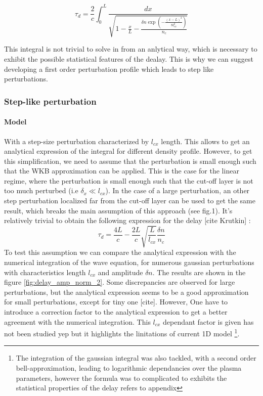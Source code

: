 \documentclass[11pt,a4paper]{report}
\begin{document}
\begin{multicols}{2}
    $$\tau_d = \frac{2}{c} \int_0^L \frac{dx}{\sqrt{1 - \frac{x}{L} - \frac{\delta n\exp(-\frac{(x - L)^2}{8l_{cx}^2})}{n_c}}}$$

    This integral is not trivial to solve in from an anlytical way, which is necessary to exhibit the possible statistical features of the dealay. This is why we can suggest developing a first order perturbation profile which leads to step like perturbations.

    \subsubsection{Step-like perturbation}
    \paragraph{Model}

    With a step-size perturbation characterized by $l_{cx}$ length. This allows to get an analytical expression of the integral for different density profile. However, to get this simplification, we need to assume that the perturbation is small enough such that the WKB approximation can be applied.
    This is the case for the linear regime, where the perturbation is small enough such that the cut-off layer is not too much perturbed (i.e $\delta_x \ll l_{cx}$). In the case of a large perturbation, an other step perturbation localized far from the cut-off layer can be used to get the same result, which breaks the main assumption of this approach (see fig.1).
    It's relatively trivial to obtain the following expression for the delay [cite Krutkin] :
    $$\tau_d = \frac{4L}{c} - \frac{2L}{c}\sqrt{\frac{L}{l_{cx}}}\frac{\delta n}{n_c} $$
    To test this assumption we can compare the analytical expression with the numerical integration of the wave equation, for numerous gaussian perturbations with characteristics length $l_{cx}$ and amplitude $\delta n$. The results are shown in the figure \ref{fig:delay_amp_norm_2}. Some discrepancies are observed for large perturbations, but the analytical expression seems to be a good approximation for small perturbations, except for tiny one [cite]. However, One have to introduce a correction
    factor to the analytical expression to get a better agreement with the numerical integration. This $l_{cx}$ dependant factor is given has not been studied yep but it highlights the linitations of current 1D model \footnote{The integration of the gaussian integral was also tackled, with a second order bell-approximation, leading to logarithmic dependancies over the plasma parameters, however the formula was to complicated to exhibits the statistical properties of the delay refers to appendix}.


\end{multicols}
\end{document}
